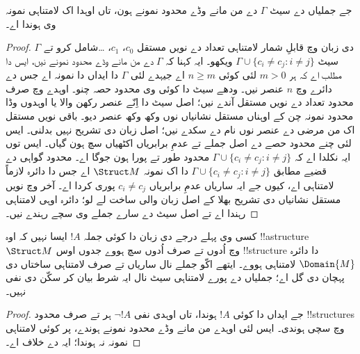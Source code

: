 \documentclass[../../../include/open-logic-section]{subfiles}
\begin{document}

\begin{thm}
 جے جملیاں دے سیٹ $\Gamma$ دے من مانے وڈے
محدود نمونے ہون، تاں اوہدا اک لامتناہی نمونہ وی ہوندا اے۔
\end{thm}

\begin{proof}
$\Gamma$ دی زبان وچ قابلِ شمار لامتناہی تعداد دے نویں مستقل
$c_0$، $c_1$، \dots شامل کرو تے سیٹ $\Gamma \cup \{c_i \neq c_j :
i \neq j\}$ ویکھو۔ ایہ کہنا کہ $\Gamma$ دے من مانے وڈے محدود نمونے
نیں، ایس دا مطلب اے کہ ہر $m >0$ لئی کوئی $n\ge m$ اے جیہدے لئی
$\Gamma$ دا ایداں دا نمونہ اے جس دے دائرے وچ $n$ عنصر نیں۔ ودھے سیٹ دا
کوئی وی محدود حصہ چنو۔ اوہدے وچ صرف محدود تعداد دے نویں مستقل آندے
نیں؛ اصل سیٹ دا اِنّے عنصر رکھن والا یا اوہدوں وڈا محدود نمونہ چن کے
اوہناں مستقل نشانیاں نوں وکھ وکھ عنصر دیو۔ باقی نویں مستقل اک من مرضی
دے عنصر نوں نام دے سکدے نیں؛ اصل زبان دی تشریح نہیں بدلنی۔ ایس لئی
چنے محدود حصے دے اصل جملے تے عدمِ برابریاں اکٹھیاں سچ ہون گیاں۔ ایس توں
ایہ نکلدا اے کہ $\Gamma \cup \{c_i \neq
c_j : i \neq j\}$ محدود طور تے پورا ہون جوگا اے۔ محدود گواہی دے
قضیے مطابق $\Gamma
\cup \{c_i \neq c_j : i \neq j\}$ دا اک نمونہ $\Struct M$
اے جس دا دائرہ لازماً لامتناہی اے، کیوں جے ایہ ساریاں عدمِ برابریاں
$c_i \neq c_j$ پوری کردا اے۔
آخر وچ نویں مستقل نشانیاں دی تشریح بھلا کے اصل زبان والی ساخت لے لو؛
دائرہ اوہی لامتناہی رہندا اے تے اصل سیٹ دے سارے جملے وی سچے رہندے نیں۔
\end{proof}

\begin{prop}
کسی وی پہلے درجے دی زبان دا کوئی جملہ $!A$ ایسا نہیں کہ اوہ
!!a{structure}~$\Struct M$ وچ اُدوں تے صرف اُدوں سچ ہووے جدوں
اوس !!{structure} دا دائرہ $\Domain{M}$ لامتناہی ہووے۔
ایتھے اکّو جملے نال ساریاں تے صرف لامتناہی ساختاں دی پہچان دی گل اے؛
جملیاں دے پورے لامتناہی سیٹ نال ایہ شرط بیان کر سکّن دی نفی نہیں۔
\end{prop}

\begin{proof}
جے ایداں دا کوئی $!A$ ہوندا، تاں اوہدی نفی $\lnot !A$ ہر تے
صرف محدود !!{structure}s وچ سچی ہوندی۔ ایس لئی اوہدے من مانے وڈے
محدود نمونے ہوندے، پر کوئی لامتناہی نمونہ نہ ہوندا؛ ایہ
 دے خلاف اے۔
\end{proof}
\end{document}
